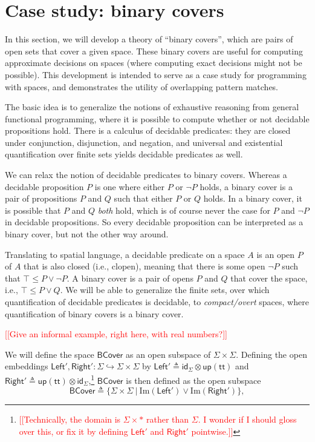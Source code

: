 \documentclass[conference]{IEEEtran}
\newcommand{\hookto}{\hookrightarrow}
\newcommand{\suchthat}{\ |\ }
\newcommand{\One}{\ast}
\newcommand{\Img}[1]{\text{Im}\left({#1}\right)}
\newcommand{\strue}{\mathsf{up}(\mathsf{tt})}
\newcommand{\BCover}{\mathsf{BCover}}
\newcommand{\note}[1]{\textcolor{red}{[[{#1}]]}}
\begin{document}
\section{Case study: binary covers}
\label{s:bcover}

In this section, we will develop a theory of ``binary covers'', which are pairs of open sets that cover a given space. These binary covers are useful for computing approximate decisions on spaces (where computing exact decisions might not be possible). This development is intended to serve as a case study for programming with spaces, and demonstrates the utility of overlapping pattern matches.

The basic idea is to generalize the notions of exhaustive reasoning from general functional programming, where it is possible to compute whether or not decidable propositions hold. There is a calculus of decidable predicates: they are closed under conjunction, disjunction, and negation, and universal and existential quantification over finite sets yields decidable predicates as well.

We can relax the notion of decidable predicates to binary covers. Whereas a decidable proposition $P$ is one where either $P$ or $\neg P$ holds, a binary cover is a pair of propositions $P$ and $Q$ such that either $P$ or $Q$ holds. In a binary cover, it is possible that $P$ and $Q$ \emph{both} hold, which is of course never the case for $P$ and $\neg P$ in decidable propositions. So every decidable proposition can be interpreted as a binary cover, but not the other way around.

Translating to spatial language, a decidable predicate on a space $A$ is an open $P$ of $A$ that is also closed (i.e., clopen), meaning that there is some open $\neg P$ such that $\top \le P \vee \neg P$. A binary cover is a pair of opens $P$ and $Q$ that cover the space, i.e., $\top \le P \vee Q$. We will be able to generalize the finite sets, over which quantification of decidable predicates is decidable, to \emph{compact/overt} spaces, where quantification of binary covers is a binary cover.

\note{Give an informal example, right here, with real numbers?}

We will define the space $\BCover$ as an open subspace of $\Sigma \times \Sigma$. Defining the open embeddings $\mathsf{Left}', \mathsf{Right}' : \Sigma \hookto \Sigma \times \Sigma$ by 
$\mathsf{Left}' \triangleq \mathsf{id}_\Sigma \otimes \strue$ and
$\mathsf{Right}' \triangleq \strue \otimes \mathsf{id}_\Sigma$,\footnote{\note{Technically, the domain is $\Sigma \times \One$ rather than $\Sigma$. I wonder if I should gloss over this, or fix it by defining $\mathsf{Left}'$ and $\mathsf{Right}'$ pointwise.}}
$\BCover$ is then defined as the open subspace
\[
\BCover \triangleq \{ \Sigma \times \Sigma \suchthat \Img{\mathsf{Left}'} \vee \Img{\mathsf{Right}'} \},
\]
\end{document}
